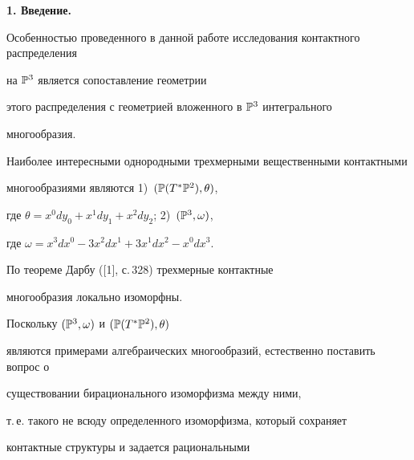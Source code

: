 \date{}




\pagestyle{plain} %







\maketitle


\label{begin}











{\bf 1. Введение.}


Особенностью проведенного в данной работе исследования контактного распределения 


на $\Bbb{P}^3$ является сопоставление геометрии 


этого распределения с геометрией вложенного в $\Bbb{P}^3$ интегрального 


многообразия. 





Наиболее интересными однородными трехмерными вещественными контактными 


многообразиями являются 1)~$(\Bbb{P}(T^{\ast}\Bbb{P}^2),\theta)$,


где $\theta=x^0dy_0+x^1dy_1+x^2dy_2$; 2)~$(\Bbb{P}^3,\omega)$,


где $\omega=x^3dx^0-3x^2dx^1+3x^1dx^2-x^0dx^3$.





По теореме Дарбу ([1], с.\,328) трехмерные контактные 


многообразия локально изоморфны. 


Поскольку $(\Bbb{P}^3,\omega)$ и $(\Bbb{P}(T^{\ast}\Bbb{P}^2),\theta)$ 


являются примерами алгебраических многообразий, естественно поставить вопрос о 


существовании бирационального изоморфизма между ними,


т.\,е. такого не всюду определенного изоморфизма, который сохраняет 


контактные структуры и задается рациональными 


